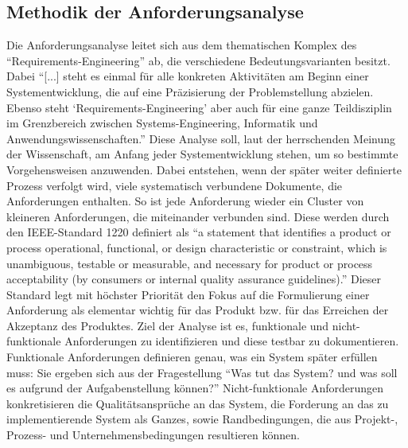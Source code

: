 \subsection{Methodik der Anforderungsanalyse}\label{kap:methodikAnfAnalyse}
Die Anforderungsanalyse leitet sich aus dem thematischen Komplex des \enquote{Requirements-Engineering} ab, die verschiedene Bedeutungsvarianten besitzt. Dabei \enquote{[...] steht es einmal für alle konkreten Aktivitäten am Beginn einer Systementwicklung, die auf eine Präzisierung der Problemstellung abzielen. Ebenso steht \enquote{Requirements-Engineering} aber auch für eine ganze Teildisziplin im Grenzbereich zwischen Systems-Engineering, Informatik und Anwendungswissenschaften.}\autocite[][S.\,19]{partsch_requirements-engineering_2010} Diese Analyse soll, laut der herrschenden Meinung der Wissenschaft, am Anfang jeder Systementwicklung stehen, um so bestimmte Vorgehensweisen anzuwenden. Dabei entstehen, wenn der später weiter definierte Prozess verfolgt wird, viele systematisch verbundene Dokumente, die Anforderungen enthalten. So ist jede Anforderung wieder ein Cluster von kleineren Anforderungen, die miteinander verbunden sind. Diese werden durch den IEEE-Standard 1220 definiert als \enquote{a statement that identifies a product or process operational, functional, or design characteristic or constraint, which is unambiguous, testable or measurable, and necessary for product or process acceptability (by consumers or internal quality assurance guidelines).}\autocite[][S.\,9]{IEEE1220-2005SystemsEng} Dieser Standard legt mit höchster Priorität den Fokus auf die Formulierung einer Anforderung als elementar wichtig für das Produkt bzw. für das Erreichen der Akzeptanz des Produktes. Ziel der Analyse ist es, funktionale und nicht-funktionale Anforderungen zu identifizieren und diese testbar zu dokumentieren. Funktionale Anforderungen definieren genau, was ein System später erfüllen muss: Sie ergeben sich aus der Fragestellung \enquote{Was tut das System? und was soll es aufgrund der Aufgabenstellung können?}\autocite[][S.\,27]{partsch_requirements-engineering_2010} Nicht-funktionale Anforderungen konkretisieren die Qualitätsansprüche an das System, die Forderung an das zu implementierende System als Ganzes, sowie Randbedingungen, die aus Projekt-, Prozess- und Unternehmensbedingungen resultieren können.\autocite[vgl.][S.\,27-29]{partsch_requirements-engineering_2010}

